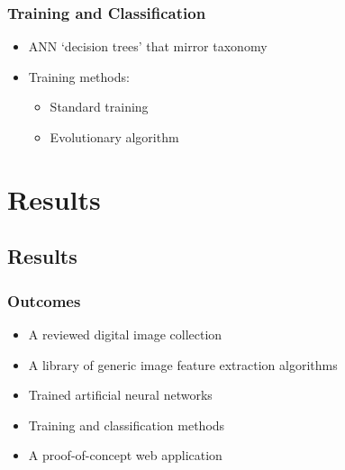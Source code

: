 \documentclass[]{beamer}
\begin{document}
    \begin{frame}
        \frametitle{Training and Classification}

        \begin{itemize}
            \item ANN `decision trees' that mirror taxonomy{\newline}


            \vspace{5 mm}

        \item Training methods:
            \begin{itemize}
                \item Standard training
                \item Evolutionary algorithm
            \end{itemize}
        \end{itemize}
    \end{frame}


\section{Results}

    \subsection{Results}

    \begin{frame}
        \frametitle{Outcomes}

        \begin{itemize}
            \item A reviewed digital image collection
            \item A library of generic image feature extraction algorithms
            \item Trained artificial neural networks
            \item Training and classification methods
            \item A proof-of-concept web application
        \end{itemize}
    \end{frame}
\end{document}
